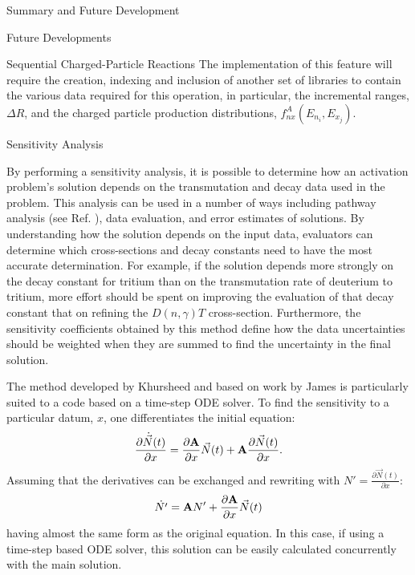 \begin{chapter}{Summary and Future Development}
\begin{section}{Future Developments}
\begin{subsection}{Sequential Charged-Particle Reactions}
      The implementation of this feature will require the creation,
      indexing and inclusion of another set of libraries to contain
      the various data required for this operation, in particular, the
      incremental ranges, $\Delta R$, and the charged particle
      production distributions, $f_{nx}^A(E_{n_i},E_{x_j})$.
    \end{subsection}

    \begin{subsection}{Sensitivity Analysis}\label{ssec:future.data.sens}
    
      By performing a sensitivity analysis, it is possible to
      determine how an activation problem's solution depends on the
      transmutation and decay data used in the problem\cite{sensPhD}.
      This analysis can be used in a number of ways including pathway
      analysis (see Ref. ), data evaluation, and error
      estimates of solutions.  By understanding how the solution
      depends on the input data, evaluators can determine which
      cross-sections and decay constants need to have the most
      accurate determination.  For example, if the solution depends
      more strongly on the decay constant for tritium than on the
      transmutation rate of deuterium to tritium, more effort should
      be spent on improving the evaluation of that decay constant that
      on refining the $D(n,\gamma)T$ cross-section.  Furthermore, the
      sensitivity coefficients obtained by this method define how the
      data uncertainties should be weighted when they are summed to
      find the uncertainty in the final solution.
    
      The method developed by Khursheed\cite{sensPhD} and based on
      work by James\cite{sensJames} is particularly suited to a code
      based on a time-step ODE solver.  To find the sensitivity
      to a particular datum, $x$, one differentiates the initial
      equation:
      \begin{equation*}
        \frac{\partial\dot{\vec{N}}(t)}{\partial x} =
        \frac{\partial\mbox{$\mathbf{A}$}}{\partial x}\vec{N}(t) +
        \mbox{$\mathbf{A}$}\frac{\partial\vec{N}(t)}{\partial x}.
      \end{equation*}
      Assuming that the derivatives can be exchanged and rewriting with $N'
      = \frac{\partial\vec{N}(t)}{\partial x}$:
      \begin{equation}
        \dot{N'} =  \mbox{$\mathbf{A}$}N' + \frac{\partial\mbox{$\mathbf{A}$}}{\partial x}\vec{N}(t)
      \end{equation}
      having almost the same form as the original equation.  In
      this case, if using a time-step based ODE solver, this solution
      can be easily calculated concurrently with the main solution.
    

\end{subsection}
\end{section}
\end{chapter}
